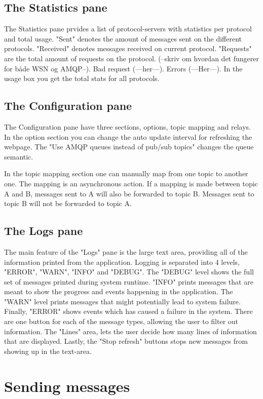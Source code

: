 \subsection{The Statistics pane}
The Statistics pane prvides a list of protocol-servers with statistics per protocol and total usage. "Sent" denotes the amount of messages sent on the different protocols. "Received" denotes messages received on current protocol. "Requests" are the total amount of requests on the protocol. (--skriv om hvordan det fungerer for både WSN og AMQP--). Bad request (---her---). Errors (---Her---). In the usage box you get the total stats for all protocols.

\subsection{The Configuration pane}
The Configuration pane have three sections, options, topic mapping and relays. In the option section you can change the auto update interval for refreshing the webpage. The "Use AMQP queues instead of pub/sub topics" changes the queue semantic.

In the topic mapping section one can manually map from one topic to another one. The mapping is an asynchronous action. If a mapping is made between topic A and B, messages sent to A will also be forwarded to topic B. Messages sent to topic B will not be forwarded to topic A.

\subsection{The Logs pane}
The main feature of the "Logs" pane is the large text area, providing all of the information printed from the application. Logging is separated into 4 levels, "ERROR", "WARN", "INFO" and "DEBUG". The "DEBUG" level shows the full set of messages printed during system runtime. "INFO" prints messages that are meant to show the progress and events happening in the application. The "WARN" level prints messages that might potentially lead to system failure. Finally, "ERROR" shows events which has caused a failure in the system. There are one button for each of the message types, allowing the user to filter out information. The "Lines" area, lets the user decide how many lines of information that are displayed. Lastly, the "Stop refresh" buttons stops new messages from showing up in the text-area.

\section{Sending messages}

